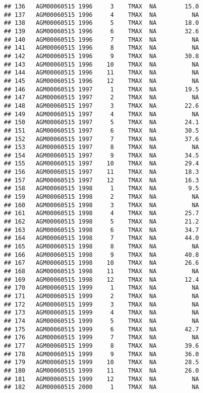 \documentclass{article}\usepackage[]{graphicx}\usepackage[]{color}
\makeatletter
\newenvironment{kframe}{%
 \def\at@end@of@kframe{}%
 \ifinner\ifhmode%
  \def\at@end@of@kframe{\end{minipage}}%
  \begin{minipage}{\columnwidth}%
 \fi\fi%
 \def\FrameCommand##1{\hskip\@totalleftmargin \hskip-\fboxsep
 \colorbox{shadecolor}{##1}\hskip-\fboxsep
     \hskip-\linewidth \hskip-\@totalleftmargin \hskip\columnwidth}%
 \MakeFramed {\advance\hsize-\width
   \@totalleftmargin\z@ \linewidth\hsize
   \@setminipage}}%
 {\par\unskip\endMakeFramed%
 \at@end@of@kframe}
\newenvironment{knitrout}{}{} %
\makeatother
\begin{document}
\begin{knitrout}
\begin{kframe}
\begin{verbatim}
## 136   AGM00060515 1996     3    TMAX  NA        15.0
## 137   AGM00060515 1996     4    TMAX  NA          NA
## 138   AGM00060515 1996     5    TMAX  NA        18.0
## 139   AGM00060515 1996     6    TMAX  NA        32.6
## 140   AGM00060515 1996     7    TMAX  NA          NA
## 141   AGM00060515 1996     8    TMAX  NA          NA
## 142   AGM00060515 1996     9    TMAX  NA        30.8
## 143   AGM00060515 1996    10    TMAX  NA          NA
## 144   AGM00060515 1996    11    TMAX  NA          NA
## 145   AGM00060515 1996    12    TMAX  NA          NA
## 146   AGM00060515 1997     1    TMAX  NA        19.5
## 147   AGM00060515 1997     2    TMAX  NA          NA
## 148   AGM00060515 1997     3    TMAX  NA        22.6
## 149   AGM00060515 1997     4    TMAX  NA          NA
## 150   AGM00060515 1997     5    TMAX  NA        24.1
## 151   AGM00060515 1997     6    TMAX  NA        30.5
## 152   AGM00060515 1997     7    TMAX  NA        37.6
## 153   AGM00060515 1997     8    TMAX  NA          NA
## 154   AGM00060515 1997     9    TMAX  NA        34.5
## 155   AGM00060515 1997    10    TMAX  NA        29.4
## 156   AGM00060515 1997    11    TMAX  NA        18.3
## 157   AGM00060515 1997    12    TMAX  NA        16.3
## 158   AGM00060515 1998     1    TMAX  NA         9.5
## 159   AGM00060515 1998     2    TMAX  NA          NA
## 160   AGM00060515 1998     3    TMAX  NA          NA
## 161   AGM00060515 1998     4    TMAX  NA        25.7
## 162   AGM00060515 1998     5    TMAX  NA        21.2
## 163   AGM00060515 1998     6    TMAX  NA        34.7
## 164   AGM00060515 1998     7    TMAX  NA        44.0
## 165   AGM00060515 1998     8    TMAX  NA          NA
## 166   AGM00060515 1998     9    TMAX  NA        40.8
## 167   AGM00060515 1998    10    TMAX  NA        26.6
## 168   AGM00060515 1998    11    TMAX  NA          NA
## 169   AGM00060515 1998    12    TMAX  NA        12.4
## 170   AGM00060515 1999     1    TMAX  NA          NA
## 171   AGM00060515 1999     2    TMAX  NA          NA
## 172   AGM00060515 1999     3    TMAX  NA          NA
## 173   AGM00060515 1999     4    TMAX  NA          NA
## 174   AGM00060515 1999     5    TMAX  NA          NA
## 175   AGM00060515 1999     6    TMAX  NA        42.7
## 176   AGM00060515 1999     7    TMAX  NA          NA
## 177   AGM00060515 1999     8    TMAX  NA        39.6
## 178   AGM00060515 1999     9    TMAX  NA        36.0
## 179   AGM00060515 1999    10    TMAX  NA        28.5
## 180   AGM00060515 1999    11    TMAX  NA        26.0
## 181   AGM00060515 1999    12    TMAX  NA          NA
## 182   AGM00060515 2000     1    TMAX  NA          NA

\end{verbatim}
\end{kframe}
\end{knitrout}
\end{document}
